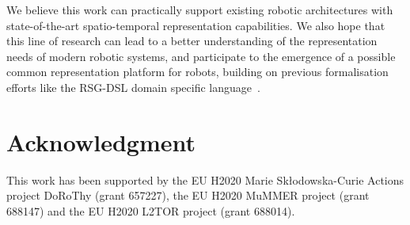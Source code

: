 \documentclass[letterpaper, 10pt, conference]{ieeeconf}
\begin{document}
We believe this work can practically support existing robotic architectures with
state-of-the-art spatio-temporal representation capabilities. We also hope that
this line of research can lead to a better understanding of the representation
needs of modern robotic systems, and participate to the emergence of a possible
common representation platform for robots, building on previous formalisation
efforts like the RSG-DSL domain specific language~\cite{blumenthal2014towards}.

\section*{Acknowledgment}

This work has been supported by the EU H2020 Marie Sk\l odowska-Curie Actions
project DoRoThy (grant 657227),  the EU H2020 MuMMER project (grant 688147)
and the EU H2020 L2TOR project (grant 688014).




\end{document}
